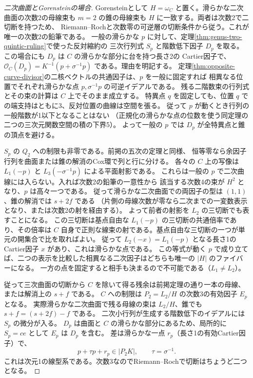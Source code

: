 \begin{proof}[二次曲面とGorensteinの場合]
Gorensteinとして $H=\omega_C$ と置く。滑らかな二次曲面の次数2の母線束も
$m=2$ の錐の母線束も $H$ に一致する。両者は次数2で二切断を持つため、
Riemann--Rochと次数零の可逆層の切断条件から従う。これが唯一の次数2の鉛筆である。
一般の滑らかな $p$ に対して、定理\ref{thm:genus-two-quintic-ruling}で使った反対縮約の
三次行列式 $S_p$ と階数低下因子 $D_p$ を取る。この場合にも $D_p$ は $C$ の滑らかな部分に台を持つ長さ2の
Cartier因子で、$\mathcal O_C(D_p)=K^{-1}(p+\sigma^{-1}p)$ である。理由を明記する。
定理\ref{thm:opposite-curve-divisor}の二核ベクトルの共通因子は、$p$ を一般に固定すれば
相異なる位置でそれぞれ滑らかな点 $p,\sigma^{-1}p$ の可逆イデアルである。
残る二階数束の行列式とその束の計算は $C$ 上でそのまま成立する。
特異点 $q$ を固定しても、位置 $q$ での端支持はともに3、反対位置の曲線は空間を張る。
従って $p$ が動くとき行列の一般階数が1以下となることはない
（正規化の滑らかな点の位数を使う同定理の二つの三次元関数空間の積の下界5）。
よって一般の $p$ では $D_p$ が全特異点と錐の頂点を避ける。

$S_p$ の $Q_2$ への制限も非零である。前掲の五次の定理と同様、
恒等零なら余因子行列を曲面または錐の解消のCox環で列と行に分ける。
各々の $C$ 上の写像は $L_1(-p)$ と $L_3(-\sigma^{-1}p)$ による平面射影である。
これらは一般の $p$ で二次曲線には入らない。入れば次数2の鉛筆の一意性から
該当する次数4の束が $H^2$ となり、$p$ は高々一つである。
従って滑らかな二次曲面での両因子の型は $(1,1)$、錐の解消では $s+2f$ である
（片側の母線次数が零なら二次までの一変数表示となり、または次数2の射を経由する）。
よって前者の射影を $L_2$ の三切断でも表すことになる。
この三切断は基点自由な $L_1(-p)$ の三切断の共通倍率であり、その倍率は
$C$ 自身で正則な線束の射である。基点自由な三切断の一つが単元の開集合で比を取ればよい。
従って $L_2(-x)=L_1(-p)$ となる長さ1のCartier因子 $x$ があり、これは滑らかな点である。
この等式が動く $p$ で成り立てば、二つの表示を比較した相異なる二次因子はどちらも唯一の $|H|$ のファイバーになる。
一方の点を固定すると相手も決まるので不可能である（$L_1\ne L_2$）。

従って三次曲面の切断から $C$ を除いて得る残余は前掲定理の通り一本の母線、または解消上の $s+f$ である。
$C$ への制限は $P_2=L_2/H$ の次数3の有効因子 $E_p$ となる。
実際滑らかな二次曲面で残る母線の束は $L_2/H$、錐でも $s+f=(s+2f)-f$ である。
二次小行列が生成する階数低下のイデアルには $S_p$ の微分が入る。
$D_p$ は曲面と $C$ の滑らかな部分にあるため、局所的に $S_p=c e$ として $E_p$ は $D_p$ を含む。
差は滑らかな一点 $r_p$（長さ1の有効Cartier因子）で、
\[
                p+\tau p+r_p\in |P_2 K|,\qquad \tau=\sigma^{-1}.
\]
これは次元1の線型系である。次数3なのでRiemann--Rochで切断はちょうど二つとなる。


\end{proof}
